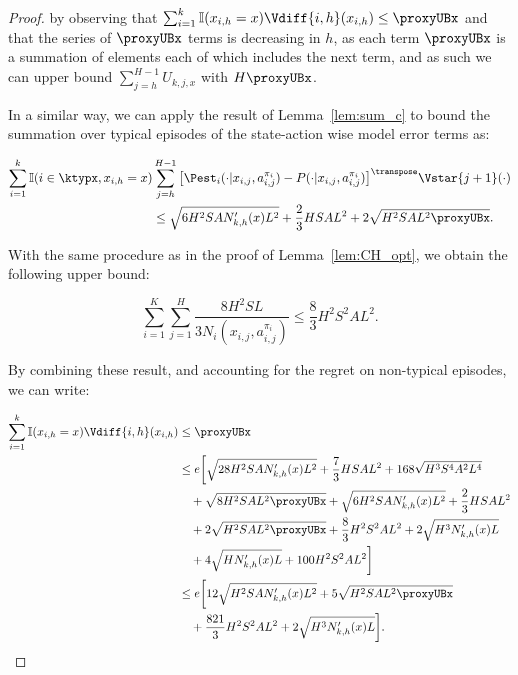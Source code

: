 \begin{proof}
by observing that $\sum_{i=1}^k \mathbb{I}(x_{i,h} = x) \Vdiff{i,h}(x_{i,h}) \le \proxyUBx$ and that the series of $\proxyUBx$ terms is decreasing in $h$, as each term $\proxyUBx$ is a summation of elements each of which includes the next term, and as such we can upper bound $\sum_{j=h}^{H-1} U_{k,j,x}$ with $H \proxyUBx$.

In a similar way, we can apply the result of Lemma~\ref{lem:sum_c} to bound the summation over typical episodes of the state-action wise model error terms as:

\begin{align*}
    \sum_{i=1}^k \mathbb{I}(i \in \ktypx, x_{i,h}=x) &\sum_{j=h}^{H-1} \big[ \Pest_i(\cdot | x_{i,j}, a_{i,j}^{\pi_i}) - P(\cdot | x_{i,j}, a_{i,j}^{\pi_i}) \big]^\transpose \Vstar{j+1}(\cdot) \\
    &\le \sqrt{6 H^2 S A N'_{k,h}(x) L^2} + \frac{2}{3} HSAL^2 + 2\sqrt{H^2 S A L^2 \proxyUBx}.
\end{align*}

With the same procedure as in the proof of Lemma~\ref{lem:CH_opt}, we obtain the following upper bound:

\begin{equation}
\label{lem:BF_opt:9}
    \sum_{i=1}^K \sum_{j=1}^H \frac{8H^2SL}{3N_i(x_{i,j},a_{i,j}^{\pi_i})} \le \frac{8}{3} H^2 S^2 A L^2.
\end{equation}

By combining these result, and accounting for the regret on non-typical episodes, we can write:

\begin{align}
    \sum_{i=1}^k \mathbb{I}(x_{i,h} = x) \Vdiff{i,h}(x_{i,h}) &\le \proxyUBx \nonumber \\
    &\le e \bigg[ \sqrt{28 H^2 S A N'_{k,h}(x) L^2} + \frac{7}{3} HSAL^2 + 168 \sqrt{H^3 S^4 A^2 L^4} \nonumber \\
    &\quad + \sqrt{8 H^2 S A L^2 \proxyUBx} + \sqrt{6 H^2 S A N'_{k,h}(x) L^2} + \frac{2}{3}HSAL^2 \nonumber \\
    &\quad + 2\sqrt{H^2 S A L^2 \proxyUBx} + \frac{8}{3} H^2 S^2 A L^2 + 2 \sqrt{H^3 N'_{k,h}(x) L} \nonumber \\
    &\quad + 4 \sqrt{H N'_{k,h}(x)L} + 100 H^2 S^2 A L^2 \bigg] \nonumber \\
    &\le e \bigg[ 12 \sqrt{H^2 S A N'_{k,h}(x) L^2} + 5 \sqrt{H^2 S A L^2 \proxyUBx} \nonumber \\
    &\quad + \frac{821}{3} H^2 S^2 A L^2 + 2 \sqrt{H^3 N'_{k,h}(x) L}\bigg]. \nonumber
\end{align}


\end{proof}
